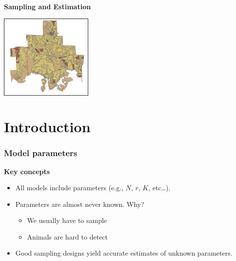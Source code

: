 \documentclass[color=usenames,dvipsnames]{beamer}\usepackage[]{graphicx}\usepackage[]{xcolor}
\begin{document}
\begin{frame}[plain]
  \begin{center}
    {\huge \bf Sampling and Estimation \par}
    \vspace{0.5cm}
    \vfill
      \includegraphics[height=4.2cm,keepaspectratio]{figs/map} \hfill %
  \end{center}
\end{frame}




\section{Introduction}



\begin{frame}
  \frametitle{Model parameters}
  \large
  {\bf Key concepts}
  \begin{itemize}%
    \item<1-> All models include parameters (e.g., $N$, $r$, $K$, etc\dots).
    \item<2-> Parameters are almost never known. Why?
      \begin{itemize}
        \large
        \item<3-> We usually have to sample
        \item<3-> Animals are hard to detect
      \end{itemize}
    \item<4-> Good sampling designs yield accurate %
      estimates of unknown parameters.
  \end{itemize}
\end{frame}
\end{document}
